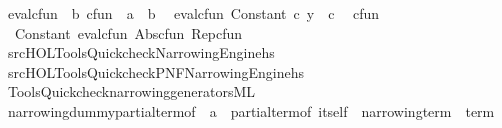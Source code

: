 \begin{isabellebody}
\isanewline
{}\isamarkupfalse%
\ eval{\isacharunderscore}{\kern0pt}cfun\ {\isacharcolon}{\kern0pt}{\isacharcolon}{\kern0pt}\ {\isachardoublequoteopen}{\isacharprime}{\kern0pt}b\ cfun\ {\isacharequal}{\kern0pt}{\isachargreater}{\kern0pt}\ {\isacharprime}{\kern0pt}a\ {\isacharequal}{\kern0pt}{\isachargreater}{\kern0pt}\ {\isacharprime}{\kern0pt}b{\isachardoublequoteclose}\isanewline
{}\isanewline
\ \ {\isachardoublequoteopen}eval{\isacharunderscore}{\kern0pt}cfun\ {\isacharparenleft}{\kern0pt}Constant\ c{\isacharparenright}{\kern0pt}\ y\ {\isacharequal}{\kern0pt}\ c{\isachardoublequoteclose}\isanewline
\isanewline
{}\isamarkupfalse%
\ {\isacharparenleft}{\kern0pt}\ cfun\isanewline
{}\isamarkupfalse%
\ {\isacharparenleft}{\kern0pt}\ Constant\ eval{\isacharunderscore}{\kern0pt}cfun\ Abs{\isacharunderscore}{\kern0pt}cfun\ Rep{\isacharunderscore}{\kern0pt}cfun%
\isadelimdocument
%
\endisadelimdocument
%
\isatagdocument
%
\isamarkuptrue%
%
\endisatagdocument
{\isafolddocument}%
%
\isadelimdocument
%
\endisadelimdocument
{}\isamarkupfalse%
\ {\isacartoucheopen}{\isachartilde}{\kern0pt}{\isachartilde}{\kern0pt}{\isacharslash}{\kern0pt}src{\isacharslash}{\kern0pt}HOL{\isacharslash}{\kern0pt}Tools{\isacharslash}{\kern0pt}Quickcheck{\isacharslash}{\kern0pt}Narrowing{\isacharunderscore}{\kern0pt}Engine{\isachardot}{\kern0pt}hs{\isacartoucheclose}\isanewline
{}\isamarkupfalse%
\ {\isacartoucheopen}{\isachartilde}{\kern0pt}{\isachartilde}{\kern0pt}{\isacharslash}{\kern0pt}src{\isacharslash}{\kern0pt}HOL{\isacharslash}{\kern0pt}Tools{\isacharslash}{\kern0pt}Quickcheck{\isacharslash}{\kern0pt}PNF{\isacharunderscore}{\kern0pt}Narrowing{\isacharunderscore}{\kern0pt}Engine{\isachardot}{\kern0pt}hs{\isacartoucheclose}\isanewline
%
\isadelimML
%
\endisadelimML
%
\isatagML
{}\isamarkupfalse%
\ {\isacartoucheopen}Tools{\isacharslash}{\kern0pt}Quickcheck{\isacharslash}{\kern0pt}narrowing{\isacharunderscore}{\kern0pt}generators{\isachardot}{\kern0pt}ML{\isacartoucheclose}%
\endisatagML
{\isafoldML}%
%
\isadelimML
\isanewline
%
\endisadelimML
\isanewline
{}\isamarkupfalse%
\ narrowing{\isacharunderscore}{\kern0pt}dummy{\isacharunderscore}{\kern0pt}partial{\isacharunderscore}{\kern0pt}term{\isacharunderscore}{\kern0pt}of\ {\isacharcolon}{\kern0pt}{\isacharcolon}{\kern0pt}\ {\isachardoublequoteopen}{\isacharparenleft}{\kern0pt}{\isacharprime}{\kern0pt}a\ {\isacharcolon}{\kern0pt}{\isacharcolon}{\kern0pt}\ partial{\isacharunderscore}{\kern0pt}term{\isacharunderscore}{\kern0pt}of{\isacharparenright}{\kern0pt}\ itself\ {\isacharequal}{\kern0pt}{\isachargreater}{\kern0pt}\ narrowing{\isacharunderscore}{\kern0pt}term\ {\isacharequal}{\kern0pt}{\isachargreater}{\kern0pt}\ term{\isachardoublequoteclose}\isanewline

\end{isabellebody}
